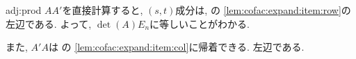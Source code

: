 \begin{proofof}{adj:prod}
  $AA'$を直接計算すると,
  $(s,t)$成分は,
  の
  \cref{lem:cofac:expand:item:row}の
  左辺である.
  よって, $\det(A)E_n$に等しいことがわかる.

  また, $A'A$は
  の
  \cref{lem:cofac:expand:item:col}に帰着できる.
  左辺である.
\end{proofof}


\endinput

\section{逆行列や正則に関する命題の証明}
ここでは, \Cref{chap:inverse}に現れる命題の証明を行う.
逆行列や正則行列に関する命題については,
一般の正方行列の場合について証明をしているので,
煩雑になっている部分がある.
$2$-次正方行列の場合のみについて証明をするのであれば,
直接計算をすることで示すほうが手っ取り早いものが多い.
行列式に関する命題は,
行列式を$2$次正方行列にしかここでは定義していないこともあり,
$2$-次正方行列の場合のみについて証明をしている.





